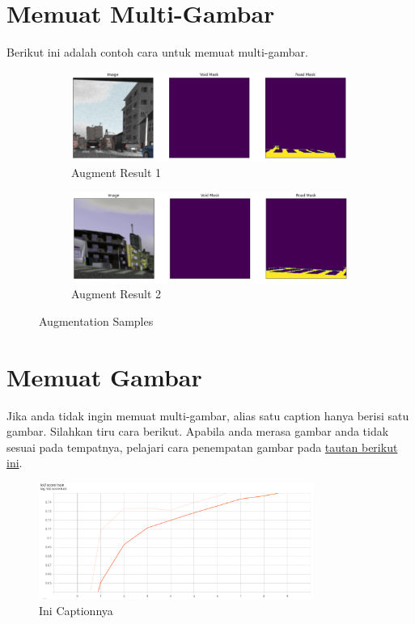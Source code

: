 \documentclass[11pt,a4paper]{article}
\begin{document}
\section{Memuat Multi-Gambar}
Berikut ini adalah contoh cara untuk memuat multi-gambar.

\begin{figure}[h]
	\centering
	\begin{subfigure}[b]{0.4\textwidth}
		\centering
		\def\svgwidth{\columnwidth}
		\includegraphics[width=1\textwidth]{Figure/aug1.png}
		\caption{Augment Result 1}
		\label{fig:aug-1}
	\end{subfigure}
	\qquad %
	\begin{subfigure}[b]{0.4\textwidth}
		\centering
		\def\svgwidth{\columnwidth}
		\includegraphics[width=1\textwidth]{Figure/aug2.png}
		\caption{Augment Result 2}
		\label{fig:aug-2}
	\end{subfigure}
	\caption{Augmentation Samples}\label{fig:aug}
\end{figure}


\newpage
\section{Memuat Gambar}
Jika anda tidak ingin memuat multi-gambar, alias satu caption hanya berisi satu gambar. Silahkan tiru cara berikut. Apabila anda merasa gambar anda tidak sesuai pada tempatnya, pelajari cara penempatan gambar pada \href{https://www.overleaf.com/learn/latex/Positioning_of_Figures}{tautan berikut ini}.
\begin{figure}[h]
    \centering
    \includegraphics[width=0.8\textwidth]{Figure/ioutrain.png}
    \caption{Ini Captionnya}
    \label{fig:my_label}
\end{figure}
\end{document}
